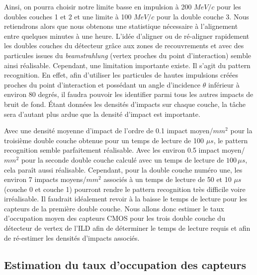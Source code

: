   Ainsi, on pourra choisir notre limite basse en impulsion \`a 200 $MeV/c$ pour les doubles couches 1 et 2 et une limite \`a 100 $MeV/c$ pour la double couche 3. Nous retiendrons alors que nous obtenons une statistique n\'ecessaire \`a l'alignement entre quelques minutes \`a une heure. L'id\'ee d'aligner ou de r\'e-aligner rapidement les doubles couches du d\'etecteur gr\^ace aux zones de recouvrements et avec des particules issues du \textit{beamstrahlung} (vertex proches du point d'interaction) semble ainsi r\'ealisable. Cependant, une limitation importante existe. Il s'agit du pattern recognition. En effet, afin d'utiliser les particules de hautes impulsions cr\'e\'ees proches du point d'interaction et possédant un angle d'incidence $\theta$ inf\'erieur \`a environ 80 degr\'es, il faudra pouvoir les identifier parmi tous les autres impacts de bruit de fond. Étant donn\'ees les densit\'es d'impacts sur chaque couche, la t\^ache sera d'autant plus ardue que la densit\'e d'impact est importante. 
  
  \medskip
  
  Avec une densit\'e moyenne d'impact de l'ordre de 0.1 impact moyen/$mm^2$ pour la troisi\`eme double couche obtenue pour un temps de lecture de 100 $\mu s$, le pattern recognition semble parfaitement r\'ealisable. Avec les environ 0.5 impact moyen/$mm^2$ pour la seconde double couche calcul\'e avec un temps de lecture de $100 \, \mu s$, cela para\^it aussi r\'ealisable. Cependant, pour la double couche num\'ero une, les environ 7 impacts moyens/$mm^2$ associ\'es \`a un temps de lecture de 50 et 10 $\mu s$ (couche 0 et couche 1) pourront rendre le pattern recognition tr\`es difficile voire irr\'ealisable. Il faudrait id\'ealement revoir \`a la baisse le temps de lecture pour les capteurs de la premi\`ere double couche. Nous allons donc estimer le taux d'occupation moyen des capteurs CMOS pour les trois double couche du d\'etecteur de vertex de l'ILD afin de d\'eterminer le temps de lecture requis et afin de r\'e-estimer les densit\'es d'impacts associ\'es. 

  \FloatBarrier
 
  \subsection{Estimation du taux d'occupation des capteurs}
  
